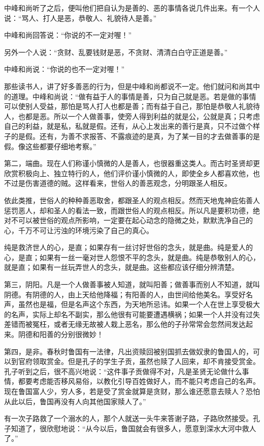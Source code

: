 \documentclass[12pt,UTF8]{ctexbook}
\begin{document}
中峰和尚听了之后，便叫他们把自认为是善的、恶的事情各说几件出来。有一个人说：“骂人、打人是恶，恭敬人、礼貌待人是善。”

中峰和尚回答说：“你说的不一定对喔！”

另外一个人说：“贪财、乱要钱财是恶，不贪财、清清白白守正道是善。”

中峰和尚说：“你说的也不一定对喔！”

那些读书人，讲了好多善恶的行为，但是中峰和尚都说不一定。他们就问和尚其中的道理。中峰和尚说：“做有益于人的事情是善，只为自己就是恶。若是做的事情可以使别人受益，那怕是骂人打人也都是善；而有益于自己，那怕是恭敬人礼貌待人，也都是恶。所以一个人做善事，使旁人得到利益的就是公，公就是真；只考虑自己的利益，就是私，私就是假。还有，从心上发出来的善行是真，只不过做个样子的是假。还有，为善不求报答、不露痕迹的是真，为了某一目的才去做善事的是假。像这些都要仔细地考察。”

第二，端曲。现在人们称谨小慎微的人是善人，也很器重这类人。而古时圣贤却更欣赏积极向上、独立特行的人，他们评价谨小慎微的人，即使全乡人都喜欢他，也不过是伤害道德的贼。这样看来，世俗人的善恶观念，分明跟圣人相反。

依此类推，世俗人的种种善恶取舍，都跟圣人的观点相反。然而天地鬼神庇佑善人惩罚恶人，却和圣人的看法一致，而跟世俗人的观点相反。所以凡是要积功德，绝对不可以被世俗的观点所影响，一定要在起心动念的隐微之处，默默洗净自己的心，千万不可让污浊的环境污染了自己的真心。

纯是救济世人的心，是直；如果存有一丝讨好世俗的念头，就是曲。纯是爱人的心，是直；如果有一丝一毫对世人怨恨不平的念头，就是曲。纯是恭敬别人的心，就是直；如果有一丝玩弄世人的念头，就是曲。这些都应该仔细分辨清楚。

第三，阴阳。凡是一个人做善事被人知道，就叫阳善；做善事而别人不知道，就叫阴德。有阴德的人，由上天给他降福；有阳善的人，由世间给他美名。享受好名声，虽然也是福，但是名声这个东西，为天地所忌讳。如果一个人在世上享受极大的名声，实际上却名不副实，那么他很有可能要遭遇横祸；如果一个人并没有过失差错而被冤枉，或者无缘无故被人栽上恶名，那么他的子孙常常会忽然间发达起来。阴德和阳善的分别很微妙！

第四，是非。春秋时鲁国有一法律，凡出资赎回被别国抓去做奴隶的鲁国人的，可以到官府领取赏金。但是孔子的学生子贡，虽然也赎了人回来，却不肯接受赏金。孔子听到之后，很不高兴地说：“这件事子贡做得不对，凡是圣贤无论做什么事情，都要考虑能否移风易俗，以教化引导百姓做好人，而不能只考虑自己的名声。现在鲁国富人少，穷人多，若是受了赏金就算是贪财，那么谁还愿意去赎人？恐怕从此以后，鲁国再没有人向其他国家赎人了。”

有一次子路救了一个溺水的人，那个人就送一头牛来答谢子路，子路欣然接受。孔子知道了，很欣慰地说：“从今以后，鲁国就会有很多人，愿意到深水大河中救人了。”
\end{document}
